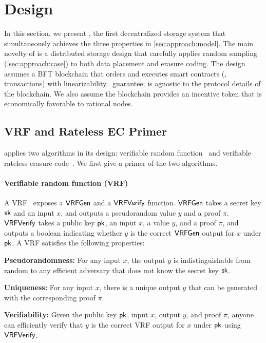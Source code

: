 \section{\sys Design}
\label{sec:design}

In this section, we present \sys, the first decentralized storage system that simultaneously achieves the three properties in \cref{sec:approach:model}.
The main novelty of \sys is a distributed storage design that carefully applies random sampling (\cref{sec:approach:case}) to both data placement and erasure coding.
The design assumes a BFT blockchain that orders and executes smart contracts (\ie, transactions) with linearizability~\cite{linearizability} guarantee;
\sys is agnostic to the protocol details of the blockchain.
We also assume the blockchain provides an incentive token that is economically favorable to rational nodes.

\subsection{VRF and Rateless EC Primer}
\label{sec:design:primer}

\sys applies two algorithms in its design: verifiable random function~\cite{vrf} and verifiable rateless erasure code~\cite{verify-rateless-ec}.
We first give a primer of the two algorithms.

\paragraph{\textbf{Verifiable random function (VRF)}}
A VRF~\cite{vrf} exposes a $\textsf{VRFGen}$ and a $\textsf{VRFVerify}$ function.
$\textsf{VRFGen}$ takes a secret key $\textsf{sk}$ and an input $x$, and outputs a pseudorandom value $y$ and a proof $\pi$.
$\textsf{VRFVerify}$ takes a public key $\textsf{pk}$, an input $x$, a value $y$, and a proof $\pi$, and outputs a boolean indicating whether $y$ is the correct $\textsf{VRFGen}$ output for $x$ under $\textsf{pk}$.
A VRF satisfies the following properties:

\noindent\textbf{Pseudorandomness:} For any input $x$, the output $y$ is indistinguishable from random to any efficient adversary that does not know the secret key $\textsf{sk}$.

\noindent\textbf{Uniqueness:} For any input $x$, there is a unique output $y$ that can be generated with the corresponding proof $\pi$.

\noindent\textbf{Verifiability:} Given the public key $\textsf{pk}$, input $x$, output $y$, and proof $\pi$, anyone can efficiently verify that $y$ is the correct VRF output for $x$ under $\textsf{pk}$ using $\textsf{VRFVerify}$.

